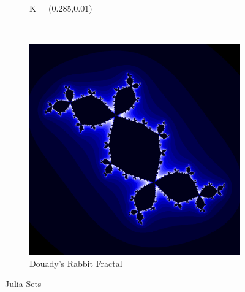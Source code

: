 \documentclass[a4paper]{article}
\begin{document}
\begin{figure}[h]
\begin{subfigure}[h]{0.25\textwidth}
        \caption{K =  (0.285,0.01)}
        \label{fig:tiger}
    \end{subfigure}
    ~ %
    \begin{subfigure}[h]{0.25\textwidth}
        \includegraphics[width=\textwidth]{JuliaRabbit}
        \caption{Douady's Rabbit Fractal}
        \label{fig:mouse}
    \end{subfigure}
    \caption{Julia Sets}\label{fig:animals}
\end{figure} 
\end{document}
